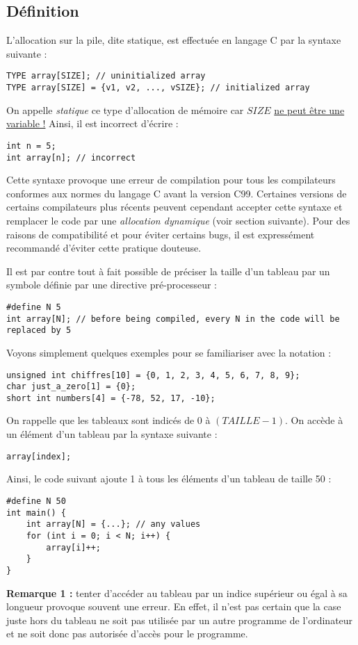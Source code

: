 \documentclass[../../../main.tex]{subfiles}
\begin{document}
\subsection{Définition}
L'allocation sur la pile, dite statique, est effectuée en langage C par la syntaxe suivante :
\begin{verbatim}
TYPE array[SIZE]; // uninitialized array
TYPE array[SIZE] = {v1, v2, ..., vSIZE}; // initialized array
\end{verbatim}
On appelle \textit{statique} ce type d'allocation de mémoire car $SIZE$ \underline{ne peut être une variable !} Ainsi, il est incorrect d'écrire :
\begin{verbatim}
int n = 5;
int array[n]; // incorrect
\end{verbatim}
Cette syntaxe provoque une erreur de compilation pour tous les compilateurs conformes aux normes du langage C avant la version C99. Certaines versions de certains compilateurs plus récents peuvent cependant accepter cette syntaxe et remplacer le code par une \textit{allocation dynamique} (voir section suivante). Pour des raisons de compatibilité et pour éviter certains bugs, il est expressément recommandé d'éviter cette pratique douteuse.
 
Il est par contre tout à fait possible de préciser la taille d'un tableau par un symbole définie par une directive pré-processeur :
\begin{verbatim}
#define N 5
int array[N]; // before being compiled, every N in the code will be replaced by 5
\end{verbatim}
Voyons simplement quelques exemples pour se familiariser avec la notation :
\begin{verbatim}
unsigned int chiffres[10] = {0, 1, 2, 3, 4, 5, 6, 7, 8, 9};
char just_a_zero[1] = {0};
short int numbers[4] = {-78, 52, 17, -10};
\end{verbatim}
On rappelle que les tableaux sont indicés de 0 à $(TAILLE - 1)$. On accède à un élément d'un tableau par la syntaxe suivante :
\begin{verbatim}
array[index];
\end{verbatim}
Ainsi, le code suivant ajoute 1 à tous les éléments d'un tableau de taille 50 :
\begin{verbatim}
#define N 50
int main() {
	int array[N] = {...}; // any values
	for (int i = 0; i < N; i++) {
		array[i]++;
	}
}
\end{verbatim}
\textbf{Remarque 1 :} tenter d'accéder au tableau par un indice supérieur ou égal à sa longueur provoque souvent une erreur. En effet, il n'est pas certain que la case juste hors du tableau ne soit pas utilisée par un autre programme de l'ordinateur et ne soit donc pas autorisée d'accès pour le programme.
 
\end{document}
